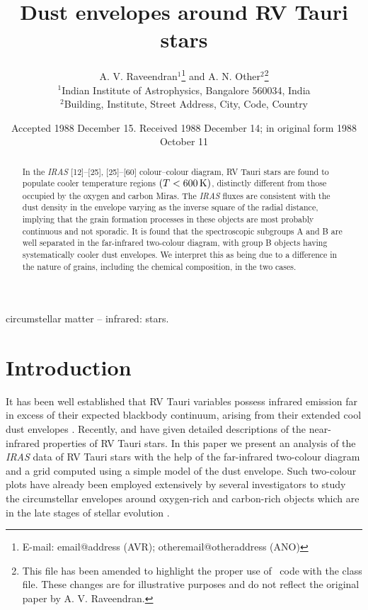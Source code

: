 \documentclass[useAMS,usenatbib]{mn2e}
\title[Dust envelopes around RV Tauri stars]{Dust envelopes around RV Tauri stars}
\author[A. V. Raveendran and A. N. Other]{A. V. Raveendran$^{1}$\thanks{E-mail:
email@address (AVR); otheremail@otheraddress (ANO)} and A. N.
Other$^{2}$\footnotemark[1]\thanks{This file has been amended to
highlight the proper use of \LaTeXe\ code with the class file.
These changes are for illustrative purposes and do not reflect the
original paper by A. V. Raveendran.}\\
$^{1}$Indian Institute of Astrophysics, Bangalore 560034, India\\
$^{2}$Building, Institute, Street Address, City, Code, Country}
\begin{document}
\date{Accepted 1988 December 15. Received 1988 December 14; in original form 1988 October 11}

\pagerange{\pageref{firstpage}--\pageref{lastpage}} 

\maketitle

\label{firstpage}

\begin{abstract}
In the {\it IRAS\/} [12]--[25],  [25]--[60] colour--colour diagram, RV
Tauri stars are found to populate cooler temperature regions
$(T<600\,{\mathrm{K}})$, distinctly different from those occupied by  the
oxygen and carbon Miras. The {\it IRAS\/} fluxes are  consistent with the
dust density in the envelope varying as the inverse square of the
radial distance, implying that the grain formation processes in these
objects are most probably continuous and not sporadic. It is found that
the spectroscopic subgroups A and B are well separated in the
far-infrared two-colour diagram, with group B objects having
systematically cooler dust envelopes. We interpret this as being due to
a difference in the nature of grains, including the chemical
composition, in the two cases.
\end{abstract}

\begin{keywords}
circumstellar matter -- infrared: stars.
\end{keywords}

\section{Introduction}

It has been well established that RV Tauri variables  possess
infrared emission far in excess of their expected  blackbody
continuum, arising from their extended cool dust envelopes
\citep{b7,b5,b6}. Recently, \citet{b15} and \citet{b9} have given
detailed descriptions of the near-infrared properties of RV Tauri
stars. In this paper we present an analysis of the {\it IRAS\/}
data of RV Tauri stars with the help of the far-infrared
two-colour diagram and a grid computed using a simple model of the
dust envelope. Such two-colour plots have already been employed
extensively by several investigators to study the circumstellar
envelopes around oxygen-rich and carbon-rich objects which are in
the late stages of stellar evolution \citep{b10,b25,b23,b24}.
\end{document}

